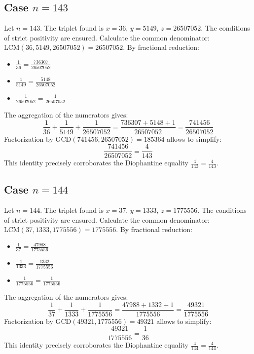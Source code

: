 \documentclass[11pt,a4paper]{article}
\begin{document}
\subsection{Case $n = 143$}
Let $n = 143$. The triplet found is $x = 36$, $y = 5149$, $z = 26507052$.
The conditions of strict positivity are ensured.
Calculate the common denominator: $\text{LCM}(36, 5149, 26507052) = 26507052$.
By fractional reduction:
\begin{itemize}
    \item $\frac{1}{36} = \frac{736307}{26507052}$
    \item $\frac{1}{5149} = \frac{5148}{26507052}$
    \item $\frac{1}{26507052} = \frac{1}{26507052}$
\end{itemize}
The aggregation of the numerators gives:
$$ \frac{1}{36} + \frac{1}{5149} + \frac{1}{26507052} = \frac{736307 + 5148 + 1}{26507052} = \frac{741456}{26507052} $$
Factorization by $\text{GCD}(741456, 26507052) = 185364$ allows to simplify:
$$ \frac{741456}{26507052} = \frac{4}{143} $$
This identity precisely corroborates the Diophantine equality $\frac{4}{143} = \frac{4}{143}$.

\subsection{Case $n = 144$}
Let $n = 144$. The triplet found is $x = 37$, $y = 1333$, $z = 1775556$.
The conditions of strict positivity are ensured.
Calculate the common denominator: $\text{LCM}(37, 1333, 1775556) = 1775556$.
By fractional reduction:
\begin{itemize}
    \item $\frac{1}{37} = \frac{47988}{1775556}$
    \item $\frac{1}{1333} = \frac{1332}{1775556}$
    \item $\frac{1}{1775556} = \frac{1}{1775556}$
\end{itemize}
The aggregation of the numerators gives:
$$ \frac{1}{37} + \frac{1}{1333} + \frac{1}{1775556} = \frac{47988 + 1332 + 1}{1775556} = \frac{49321}{1775556} $$
Factorization by $\text{GCD}(49321, 1775556) = 49321$ allows to simplify:
$$ \frac{49321}{1775556} = \frac{1}{36} $$
This identity precisely corroborates the Diophantine equality $\frac{4}{144} = \frac{4}{144}$.
\end{document}
